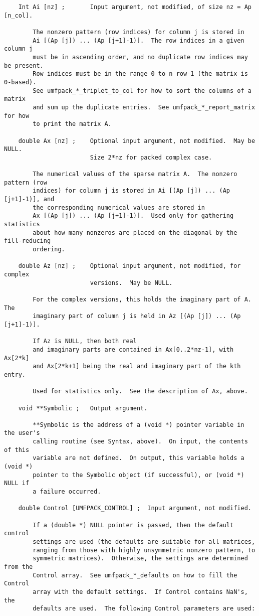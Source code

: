\documentclass[11pt]{article}
\begin{document}
{\begin{verbatim}
    Int Ai [nz] ;       Input argument, not modified, of size nz = Ap [n_col].

        The nonzero pattern (row indices) for column j is stored in
        Ai [(Ap [j]) ... (Ap [j+1]-1)].  The row indices in a given column j
        must be in ascending order, and no duplicate row indices may be present.
        Row indices must be in the range 0 to n_row-1 (the matrix is 0-based).
        See umfpack_*_triplet_to_col for how to sort the columns of a matrix
        and sum up the duplicate entries.  See umfpack_*_report_matrix for how
        to print the matrix A.

    double Ax [nz] ;    Optional input argument, not modified.  May be NULL.
                        Size 2*nz for packed complex case.

        The numerical values of the sparse matrix A.  The nonzero pattern (row
        indices) for column j is stored in Ai [(Ap [j]) ... (Ap [j+1]-1)], and
        the corresponding numerical values are stored in
        Ax [(Ap [j]) ... (Ap [j+1]-1)].  Used only for gathering statistics
        about how many nonzeros are placed on the diagonal by the fill-reducing
        ordering.

    double Az [nz] ;    Optional input argument, not modified, for complex
                        versions.  May be NULL.

        For the complex versions, this holds the imaginary part of A.  The
        imaginary part of column j is held in Az [(Ap [j]) ... (Ap [j+1]-1)].

        If Az is NULL, then both real
        and imaginary parts are contained in Ax[0..2*nz-1], with Ax[2*k]
        and Ax[2*k+1] being the real and imaginary part of the kth entry.

        Used for statistics only.  See the description of Ax, above.

    void **Symbolic ;   Output argument.

        **Symbolic is the address of a (void *) pointer variable in the user's
        calling routine (see Syntax, above).  On input, the contents of this
        variable are not defined.  On output, this variable holds a (void *)
        pointer to the Symbolic object (if successful), or (void *) NULL if
        a failure occurred.

    double Control [UMFPACK_CONTROL] ;  Input argument, not modified.

        If a (double *) NULL pointer is passed, then the default control
        settings are used (the defaults are suitable for all matrices,
        ranging from those with highly unsymmetric nonzero pattern, to
        symmetric matrices).  Otherwise, the settings are determined from the
        Control array.  See umfpack_*_defaults on how to fill the Control
        array with the default settings.  If Control contains NaN's, the
        defaults are used.  The following Control parameters are used:


\end{verbatim}}
\end{document}

